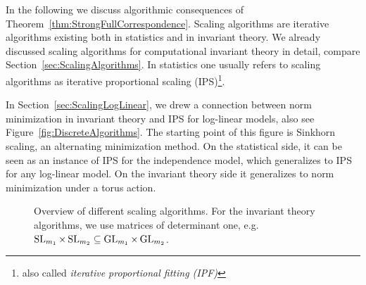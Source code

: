 In the following we discuss algorithmic consequences of Theorem~\ref{thm:StrongFullCorrespondence}.
Scaling algorithms are iterative algorithms existing both in statistics and in invariant theory. We already discussed scaling algorithms for computational invariant theory in detail, compare Section~\ref{sec:ScalingAlgorithms}. In statistics one usually refers to scaling algorithms as iterative proportional scaling (IPS)\footnote{also called \emph{iterative proportional fitting (IPF)}}.

In Section~\ref{sec:ScalingLogLinear}, we drew a connection between norm minimization in invariant theory and IPS for log-linear models, also see Figure~\ref{fig:DiscreteAlgorithms}. The starting point of this figure is Sinkhorn scaling, an alternating minimization method. On the statistical side, it can be seen as an instance of IPS for the independence model, which generalizes to IPS for any log-linear model. On the invariant theory side it generalizes to norm minimization under a torus action.

\begin{figure}[htbp]
	\centering
	
	\caption{{\cite[Figure~1]{SiagaPaper}} Overview of different scaling algorithms.  For the invariant theory algorithms, we use matrices of determinant one, e.g. $\operatorname{SL}_{m_1} \times \operatorname{SL}_{m_2} \subseteq \operatorname{GL}_{m_1} 
		\times \operatorname{GL}_{m_2}$.}
	\label{fig:GaussianAlgorithms}
\end{figure}

